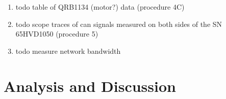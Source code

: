 \documentclass[12pt]{article}
\begin{document}
\begin{enumerate}
\item todo table of QRB1134 (motor?) data (procedure 4C)
\item todo scope traces of can signals measured on both sides of the SN
65HVD1050 (procedure 5)
\item todo measure network bandwidth
\end{enumerate}


\section{Analysis and Discussion}
\end{document}

